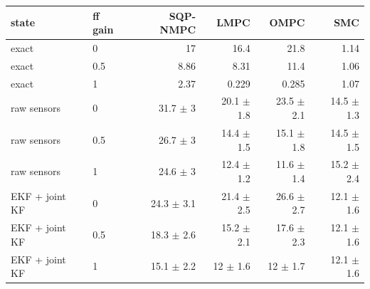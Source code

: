 \begin{tabular}{llrrrr}
\toprule
state & ff gain & SQP-NMPC & LMPC & OMPC & SMC \\
\midrule
exact & 0 & 17 & 16.4 & 21.8 & 1.14 \\
exact & 0.5 & 8.86 & 8.31 & 11.4 & 1.06 \\
exact & 1 & 2.37 & 0.229 & 0.285 & 1.07 \\
\addlinespace
raw sensors & 0 & 31.7 $\pm$ 3 & 20.1 $\pm$ 1.8 & 23.5 $\pm$ 2.1 & 14.5 $\pm$ 1.3 \\
raw sensors & 0.5 & 26.7 $\pm$ 3 & 14.4 $\pm$ 1.5 & 15.1 $\pm$ 1.8 & 14.5 $\pm$ 1.5 \\
raw sensors & 1 & 24.6 $\pm$ 3 & 12.4 $\pm$ 1.2 & 11.6 $\pm$ 1.4 & 15.2 $\pm$ 2.4 \\
\addlinespace
EKF + joint KF & 0 & 24.3 $\pm$ 3.1 & 21.4 $\pm$ 2.5 & 26.6 $\pm$ 2.7 & 12.1 $\pm$ 1.6 \\
EKF + joint KF & 0.5 & 18.3 $\pm$ 2.6 & 15.2 $\pm$ 2.1 & 17.6 $\pm$ 2.3 & 12.1 $\pm$ 1.6 \\
EKF + joint KF & 1 & 15.1 $\pm$ 2.2 & 12 $\pm$ 1.6 & 12 $\pm$ 1.7 & 12.1 $\pm$ 1.6 \\
\bottomrule
\end{tabular}
